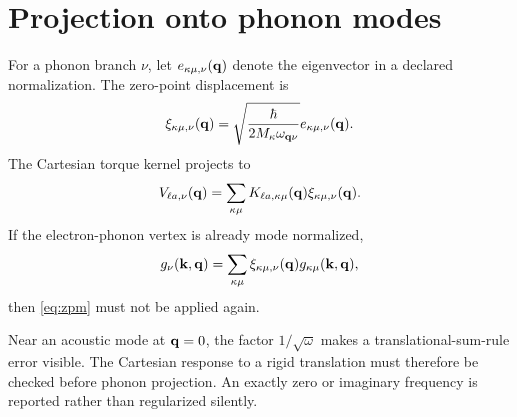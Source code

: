 \section{Projection onto phonon modes}
\label{sec:phonons}

For a phonon branch $\nu$, let $e_{\kappa\mu,\nu}(\mathbf q)$ denote the eigenvector in a declared normalization. The zero-point displacement is
\begin{equation}
\xi_{\kappa\mu,\nu}(\mathbf q)
=\sqrt{\frac{\hbar}{2M_\kappa\omega_{\mathbf q\nu}}}
 e_{\kappa\mu,\nu}(\mathbf q).
\label{eq:zpm}
\end{equation}
The Cartesian torque kernel projects to
\begin{equation}
V_{\ell a,\nu}(\mathbf q)
=\sum_{\kappa\mu}
K_{\ell a,\kappa\mu}(\mathbf q)
\xi_{\kappa\mu,\nu}(\mathbf q).
\label{eq:phonon-proj}
\end{equation}
If the electron-phonon vertex is already mode normalized,
\begin{equation}
g_\nu(\mathbf k,\mathbf q)
=\sum_{\kappa\mu}\xi_{\kappa\mu,\nu}(\mathbf q)
 g_{\kappa\mu}(\mathbf k,\mathbf q),
\label{eq:mode-g}
\end{equation}
then \cref{eq:zpm} must not be applied again.

Near an acoustic mode at $\mathbf q=0$, the factor $1/\sqrt{\omega}$ makes a translational-sum-rule error visible. The Cartesian response to a rigid translation must therefore be checked before phonon projection. An exactly zero or imaginary frequency is reported rather than regularized silently.
